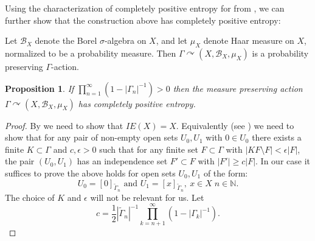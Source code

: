 \documentclass[oneside,english]{amsart}
\newtheorem{prop}[thm]{Proposition}
\theoremstyle{definition}
\newcommand{\act}[2]{{#1} \curvearrowright {#2}}
\begin{document}
Using the characterization of completely positive entropy for from \cite{MR3314515}, we can further show that the construction above has completely positive entropy:

Let $\mathcal{B}_X$ denote the Borel $\sigma$-algebra on $X$, and let $\mu_X$ denote Haar measure on $X$, normalized to be a probability measure.
Then $\act{\Gamma}{(X,\mathcal{B}_X,\mu_X)}$ is a probability preserving $\Gamma$-action.

\begin{prop}
If $ \prod_{n=1}^\infty(1 - |\Gamma_n|^{-1})>0$ then the measure preserving action $\act{\Gamma}{(X,\mathcal{B}_X,\mu_X)}$ has completely positive entropy.
\end{prop}
\begin{proof}
By \cite[Corollary $8.4$]{MR3314515} we need to show that $\mathit{IE}(X)=X$. Equivalently (see \cite[Definition $2.3$]{MR3314515})  we need to show that for any pair of non-empty open sets $U_0,U_1$ with $0 \in U_0$  there exists a finite $K \subset \Gamma$  and $c,\epsilon >0$ such that for any finite set $F \subset \Gamma$ with $|K F \setminus F| < \epsilon |F|$, the pair $(U_0,U_1)$ has an independence set $F' \subset F$ with $|F'| \ge c |F|$. In our case it suffices to prove the above holds for open sets  $U_0,U_1$ of the form:
$$U_0 = [0]_{\tilde \Gamma_n}\mbox { and } U_1 = [x]_{\tilde \Gamma_n},~ x \in X\; n \in \mathbb{N}.$$
The choice of $K$ and $\epsilon$ will not be relevant for us.
Let $$c = \frac{1}{2}|\tilde \Gamma_n|^{-1} \prod_{k=n+1}^\infty (1-|\Gamma_k|^{-1}).$$


\end{proof}
\end{document}
